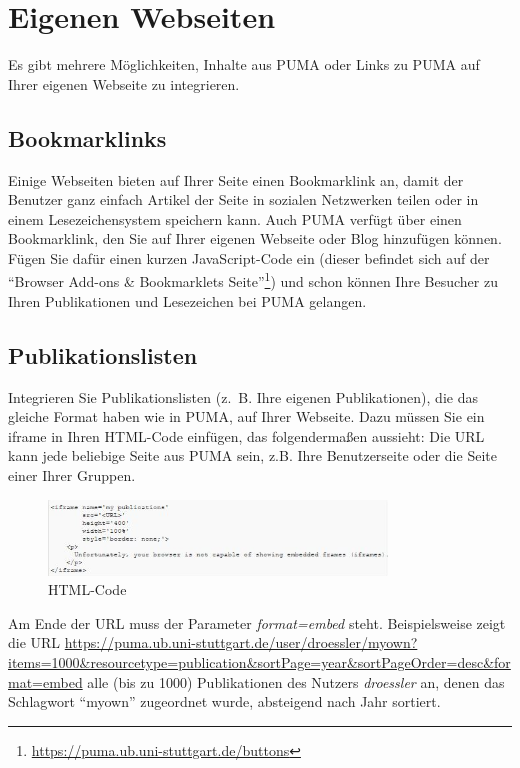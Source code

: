 

\section{Eigenen Webseiten}
\label{sec:eigeneWebseiten}
Es gibt mehrere Möglichkeiten, Inhalte aus PUMA oder Links zu PUMA auf Ihrer eigenen Webseite zu integrieren.

\subsection{Bookmarklinks}
\label{subsec:bookmarklinks}
Einige Webseiten bieten  auf Ihrer Seite einen Bookmarklink an, damit der Benutzer ganz einfach Artikel der Seite in sozialen Netzwerken teilen oder in einem Lesezeichensystem speichern kann. 
\newline Auch PUMA verfügt über einen Bookmarklink, den Sie auf Ihrer eigenen Webseite oder Blog hinzufügen können. Fügen Sie dafür einen kurzen JavaScript-Code ein (dieser befindet sich auf der \enquote{Browser Add-ons \& Bookmarklets Seite}\footnote{\url{https://puma.ub.uni-stuttgart.de/buttons}}) und schon können Ihre Besucher zu Ihren Publikationen und Lesezeichen bei PUMA gelangen.

\subsection{Publikationslisten}
\label{subsec:publikationslisten}
Integrieren Sie Publikationslisten (z.~B. Ihre eigenen Publikationen), die das gleiche Format haben wie in PUMA, auf Ihrer Webseite. Dazu müssen Sie ein iframe in Ihren HTML-Code einfügen, das folgendermaßen aussieht:\newline %
Die URL kann jede beliebige Seite aus PUMA sein, z.B. Ihre Benutzerseite oder die Seite einer Ihrer Gruppen. 
\begin{figure}[h!]
 \centering
 \includegraphics[width=9cm]{Bilder/Kapitel9/HTML-Code.PNG}
 \caption{HTML-Code}
 \label{fig:htmlCode}
\end{figure}
\begin{mdframed}[style=mdfexample1,frametitle={WICHTIG},backgroundcolor=gray!40]Am Ende der URL muss der Parameter \textit{format=embed} steht. Beispielsweise zeigt die URL \url{https://puma.ub.uni-stuttgart.de/user/droessler/myown?items=1000&resourcetype=publication&sortPage=year&sortPageOrder=desc&format=embed}
 alle (bis zu 1000) Publikationen des Nutzers \textit{droessler} an, denen das Schlagwort \enquote{myown} zugeordnet wurde, absteigend nach Jahr sortiert.
\end{mdframed}
